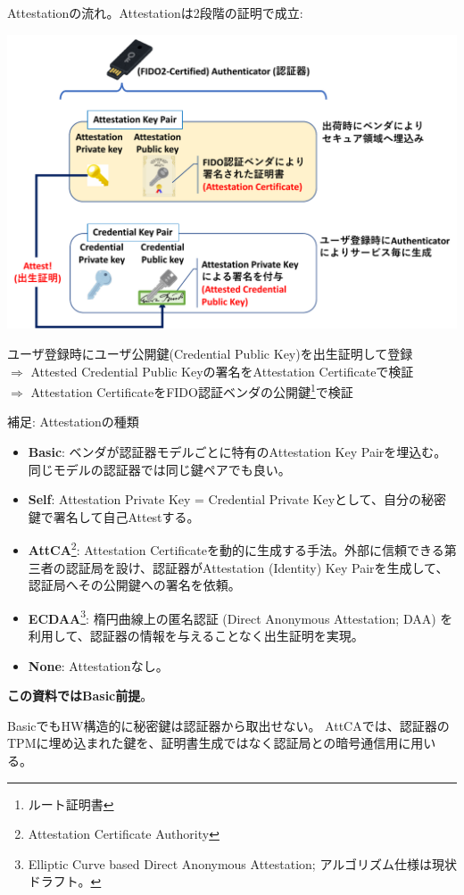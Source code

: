 \documentclass[12pt,dvipdfmx,uplatex]{beamer}
\begin{document}
\begin{frame}
\small 
Attestationの流れ。Attestationは2段階の証明で成立:
\begin{center}
\includegraphics[width=0.7\linewidth]{Figs/webauthn-attestation.pdf}
\end{center}

ユーザ登録時にユーザ公開鍵(Credential Public Key)を出生証明して登録\\
$\Rightarrow$ Attested Credential Public Keyの署名をAttestation Certificateで検証\\
$\Rightarrow$ Attestation CertificateをFIDO認証ベンダの公開鍵\footnote[frame]{\scriptsize ルート証明書}で検証
\end{frame}

\begin{frame}
\small
\begin{exampleblock}{\small 補足: Attestationの種類}
\footnotesize
\begin{itemize}
\setlength{\itemsep}{0ex}
 \item \textbf{Basic}: ベンダが認証器モデルごとに特有のAttestation Key Pairを埋込む。同じモデルの認証器では同じ鍵ペアでも良い。
 \item \textbf{Self}: Attestation Private Key = Credential Private Keyとして、自分の秘密鍵で署名して自己Attestする。
 \item \textbf{AttCA}\footnote[frame]{\scriptsize Attestation Certificate Authority}: Attestation Certificateを動的に生成する手法。外部に信頼できる第三者の認証局を設け、認証器がAttestation (Identity) Key Pairを生成して、認証局へその公開鍵への署名を依頼。
 \item \textbf{ECDAA}\footnote[frame]{\scriptsize Elliptic Curve based Direct Anonymous Attestation; アルゴリズム仕様は現状ドラフト。}: 楕円曲線上の匿名認証 (Direct Anonymous Attestation; DAA) を利用して、認証器の情報を与えることなく出生証明を実現。
 \item \textbf{None}: Attestationなし。
\end{itemize}
\end{exampleblock}
\textbf{この資料ではBasic前提}。

BasicでもHW構造的に\alert{秘密鍵は認証器から取出せない}。
AttCAでは、認証器のTPMに埋め込まれた鍵を、証明書生成ではなく認証局との暗号通信用に用いる。
\end{frame}
\end{document}
